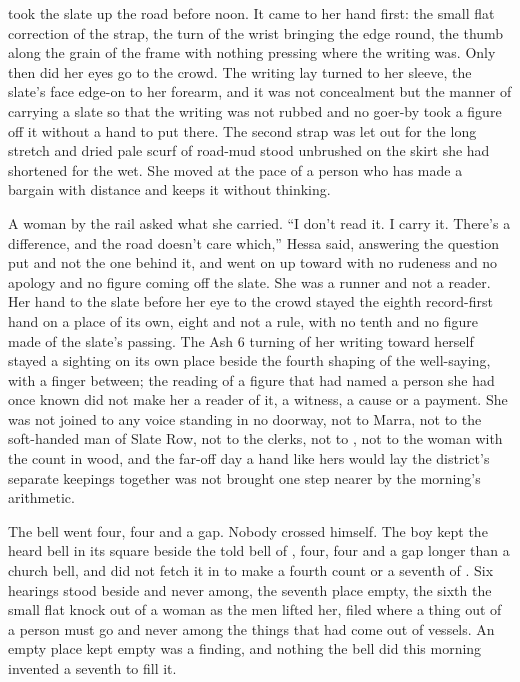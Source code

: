 \scenebreak

 took the slate up the road before noon. It came to her hand first: the small flat correction of the strap, the turn of the wrist bringing the edge round, the thumb along the grain of the frame with nothing pressing where the writing was. Only then did her eyes go to the crowd. The writing lay turned to her sleeve, the slate's face edge-on to her forearm, and it was not concealment but the manner of carrying a slate so that the writing was not rubbed and no goer-by took a figure off it without a hand to put there. The second strap was let out for the long stretch and dried pale scurf of road-mud stood unbrushed on the skirt she had shortened for the wet. She moved at the pace of a person who has made a bargain with distance and keeps it without thinking.

A woman by the rail asked what she carried. “I don't read it. I carry it. There's a difference, and the road doesn't care which,” Hessa said, answering the question put and not the one behind it, and went on up toward  with no rudeness and no apology and no figure coming off the slate. She was a runner and not a reader. Her hand to the slate before her eye to the crowd stayed the eighth record-first hand on a place of its own, eight and not a rule, with no tenth and no figure made of the slate's passing. The Ash 6 turning of her writing toward herself stayed a sighting on its own place beside the fourth shaping of the well-saying, with a finger between; the reading of a figure that had named a person she had once known did not make her a reader of it, a witness, a cause or a payment. She was not joined to any voice standing in no doorway, not to Marra, not to the soft-handed man of Slate Row, not to the clerks, not to , not to the woman with the count in wood, and the far-off day a hand like hers would lay the district's separate keepings together was not brought one step nearer by the morning's arithmetic.

The bell went four, four and a gap. Nobody crossed himself. The boy kept the heard bell in its square beside the told bell of , four, four and a gap longer than a church bell, and did not fetch it in to make a fourth count or a seventh of . Six hearings stood beside and never among, the seventh place empty, the sixth the small flat knock out of a woman as the men lifted her, filed where a thing out of a person must go and never among the things that had come out of vessels. An empty place kept empty was a finding, and nothing the bell did this morning invented a seventh to fill it.

